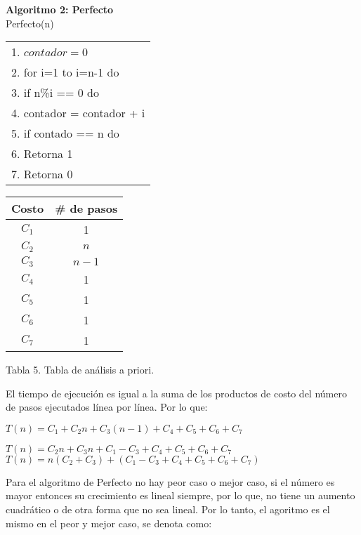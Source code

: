 \documentclass[12pt,twoside]{article}
\begin{document}
\begin{minipage}{0.45\linewidth}
  \textbf{Algoritmo 2: Perfecto}\label{alg:cap}\\ 
  Perfecto(n)
  \begin{tabular}{l}
    1. $contador = 0$ \\
    2. for i=1 to i=n-1 do\\
    3. \quad if n\%i == 0 do\\
    4. \quad \quad contador = contador + i\\
    5. if contado == n do \\
    6. \quad Retorna 1  \\
    7. Retorna 0 \\
  \end{tabular}
\end{minipage}\hfill
\begin{minipage}{0.45\linewidth}
  \centering
  \begin{tabular}{|c|c|}
    \hline
    \textbf{Costo} & \textbf{\# de pasos} \\
    \hline
    $C_1$  & 1 \\
    $C_2$  & $n$ \\
    $C_3$  & $n-1$ \\
    $C_4$  & 1 \\
    $C_5$  & 1 \\
    $C_6$  & 1 \\
    $C_7$  & 1 \\
    \hline
  \end{tabular}
  \par
  Tabla 5. Tabla de análisis a priori.
\end{minipage}

\medskip

El tiempo de ejecución es igual a la suma de los productos de costo del número de pasos ejecutados línea por línea. Por lo que:

\begin{center}
  $T(n)=C_1+C_2n+C_3(n-1)+C_4+C_5+C_6+C_7$
  \par
  $T(n)=C_2n+C_3n+C_1-C_3+C_4+C_5+C_6+C_7$
  \medskip
  $T(n)=n(C_2+C_3)+(C_1-C_3+C_4+C_5+C_6+C_7)$
\end{center}

\medskip

Para el algoritmo de Perfecto no hay peor caso o mejor caso, si el número es mayor entonces su crecimiento es lineal siempre, por lo que,
no tiene un aumento cuadrático o de otra forma que no sea lineal. Por lo tanto, el agoritmo es el mismo en el peor y mejor caso, se denota como:
\end{document}

